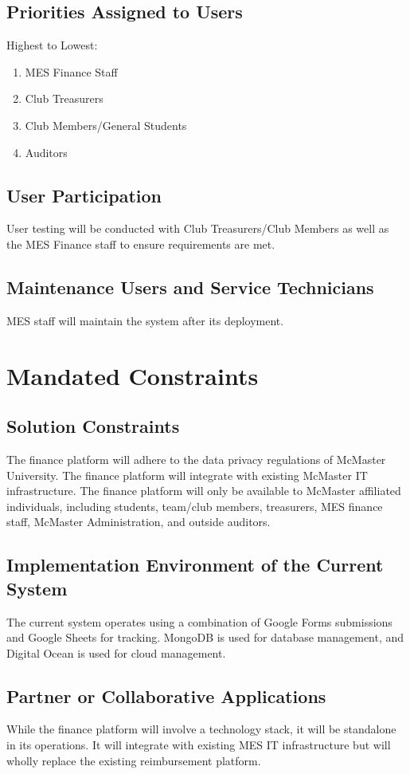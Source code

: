 \documentclass[12pt]{article}
\begin{document}
\subsection{Priorities Assigned to Users}
Highest to Lowest:
\begin{enumerate}
    \item MES Finance Staff
    \item Club Treasurers
    \item Club Members/General Students
    \item Auditors
\end{enumerate}

\subsection{User Participation}
User testing will be conducted with Club Treasurers/Club Members as well as the MES Finance staff to ensure requirements are met.

\subsection{Maintenance Users and Service Technicians}
MES staff will maintain the system after its deployment.


\section{Mandated Constraints}
\subsection{Solution Constraints}
The finance platform will adhere to the data privacy regulations of McMaster University.
The finance platform will integrate with existing McMaster IT infrastructure.
The finance platform will only be available to McMaster affiliated individuals, including students, team/club members, treasurers, MES finance staff, McMaster Administration, and outside auditors.

\subsection{Implementation Environment of the Current System}
The current system operates using a combination of Google Forms submissions and Google Sheets for tracking. MongoDB is used for database management, and Digital Ocean is used for cloud management.

\subsection{Partner or Collaborative Applications}
While the finance platform will involve a technology stack, it will be standalone in its operations. It will integrate with existing MES IT infrastructure but will wholly replace the existing reimbursement platform.
\end{document}

